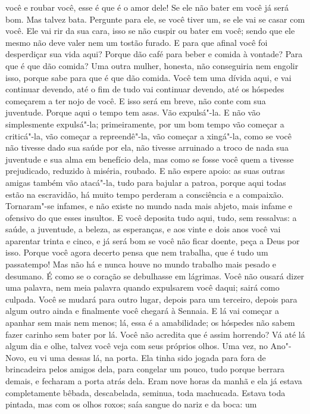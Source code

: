 você e roubar você, esse é que é o amor dele! Se ele não bater em você
já será bom. Mas talvez bata. Pergunte para ele, se você tiver um, se
ele vai se casar com você. Ele vai rir da sua cara, isso se não cuspir
ou bater em você; sendo que ele mesmo não deve valer nem um tostão
furado. E para que afinal você foi desperdiçar sua vida aqui? Porque
dão café para beber e comida à vontade? Para que é que dão comida? Uma
outra mulher, honesta, não conseguiria nem engolir isso, porque sabe
para que é que dão comida. Você tem uma dívida aqui, e vai continuar
devendo, até o fim de tudo vai continuar devendo, até os hóspedes
começarem a ter nojo de você. E isso será em breve, não conte com sua
juventude. Porque aqui o tempo tem asas. Vão expulsá"-la. E não vão
simplesmente expulsá"-la; primeiramente, por um bom tempo vão começar a
criticá"-la, vão começar a repreendê"-la, vão começar a xingá"-la, como se
você não tivesse dado sua saúde por ela, não tivesse arruinado a troco
de nada sua juventude e sua alma em benefício dela, mas como se fosse
você quem a tivesse prejudicado, reduzido à miséria, roubado. E não
espere apoio: as suas outras amigas também vão atacá"-la, tudo para
bajular a patroa, porque aqui todas estão na escravidão, há muito tempo
perderam a consciência e a compaixão. Tornaram"-se infames, e não existe
no mundo nada mais abjeto, mais infame e ofensivo do que esses
insultos. E você deposita tudo aqui, tudo, sem ressalvas: a saúde, a
juventude, a beleza, as esperanças, e aos vinte e dois anos você vai
aparentar trinta e cinco, e já será bom se você não ficar doente, peça
a Deus por isso. Porque você agora decerto pensa que nem trabalha, que
é tudo um passatempo! Mas não há e nunca houve no mundo trabalho mais
pesado e desumano. É como se o coração se debulhasse em lágrimas. Você
não ousará dizer uma palavra, nem meia palavra quando expulsarem você
daqui; sairá como culpada. Você se mudará para outro lugar, depois para
um terceiro, depois para algum outro ainda e finalmente você chegará à
Sennaia. E lá vai começar a apanhar sem mais nem menos; lá, essa é a
amabilidade; os hóspedes não sabem fazer carinho sem bater por lá. Você
não acredita que é assim horrendo? Vá até lá algum dia e olhe, talvez
você veja com seus próprios olhos. Uma vez, no Ano"-Novo, eu vi uma
dessas lá, na porta. Ela tinha sido jogada para fora de brincadeira
pelos amigos dela, para congelar um pouco, tudo porque berrara demais,
e fecharam a porta atrás dela. Eram nove horas da manhã e ela já estava
completamente bêbada, descabelada, seminua, toda machucada. Estava toda
pintada, mas com os olhos roxos; saía sangue do nariz e da boca: um
